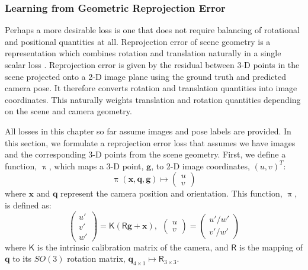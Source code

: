 \subsubsection{Learning from Geometric Reprojection Error}
\label{sec:reproj}

Perhaps a more desirable loss is one that does not require balancing of rotational and positional quantities at all. Reprojection error of scene geometry is a representation which combines rotation and translation naturally in a single scalar loss \citep{hartley2000}. Reprojection error is given by the residual between 3-D points in the scene projected onto a 2-D image plane using the ground truth and predicted camera pose. It therefore converts rotation and translation quantities into image coordinates. This naturally weights translation and rotation quantities depending on the scene and camera geometry.

All losses in this chapter so far assume images and pose labels are provided. In this section, we formulate a reprojection error loss that assumes we have images and the corresponding 3-D points from the scene geometry. First, we define a function, $\uppi$, which maps a 3-D point, $\mathbf{g}$, to 2-D image coordinates, $(u,v)^T$:
\begin{equation}
\uppi (\mathbf{x},\mathbf{q},\mathbf{g}) \mapsto \begin{pmatrix} u \\ v \end{pmatrix}
\end{equation}
where $\mathbf{x}$ and $\mathbf{q}$ represent the camera position and orientation. This function, $\uppi$, is defined as:
\begin{equation}
\begin{pmatrix} u' \\ v' \\ w' \end{pmatrix} = \mathsf{K} ( \mathsf{R} \mathbf{g} + \mathbf{x}), 
~~\begin{pmatrix} u \\ v \end{pmatrix} = \begin{pmatrix} u'/w' \\ v'/w' \end{pmatrix}
\end{equation}
where $\mathsf{K}$ is the intrinsic calibration matrix of the camera, and $\mathsf{R}$ is the mapping of $\mathbf{q}$ to its $SO(3)$ rotation matrix, $\textbf{q}_{4\times1} \mapsto \mathsf{R}_{3\times3}$.


